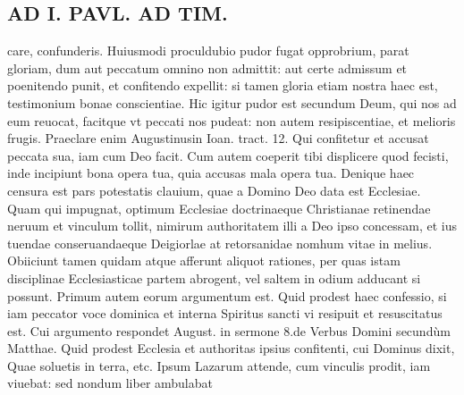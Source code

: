 \documentclass{article}
\begin{document}
\begin{pages}
\section*{AD I. PAVL. AD TIM. }
\marginpar{[ p.326 ]}\pstart care, confunderis. Huiusmodi proculdubio pudor fugat opprobrium, parat gloriam, dum aut peccatum omnino non admittit: aut certe admissum et poenitendo punit, et confitendo expellit: si tamen gloria etiam nostra haec est, testimonium bonae conscientiae. Hic igitur pudor est secundum Deum, qui nos ad eum reuocat, facitque vt peccati nos pudeat: non autem resipiscentiae, et melioris frugis. Praeclare enim Augustinusin Ioan. tract. 12. Qui confitetur et accusat peccata sua, iam cum Deo facit. Cum autem coeperit tibi displicere quod fecisti, inde incipiunt bona opera tua, quia accusas mala opera tua. Denique haec censura est pars potestatis clauium, quae a Domino Deo data est Ecclesiae. Quam qui impugnat, optimum Ecclesiae doctrinaeque Christianae retinendae neruum et vinculum tollit, nimirum authoritatem illi a Deo ipso concessam, et ius tuendae conseruandaeque Deigiorlae at retorsanidae nomhum vitae in melius.  \pend\pstart Obiiciunt tamen quidam atque afferunt aliquot rationes, per quas istam disciplinae Ecclesiasticae partem abrogent, vel saltem in odium adducant si possunt.  \pend\pstart Primum autem eorum argumentum est. Quid prodest haec confessio, si iam peccator voce dominica et interna Spiritus sancti vi resipuit et resuscitatus est. Cui argumento respondet August. in sermone 8.de Verbus  Domini secundùm Matthae. Quid prodest Ecclesia et authoritas ipsius confitenti, cui Dominus dixit, Quae soluetis in terra, etc. Ipsum Lazarum attende, cum vinculis prodit, iam viuebat: sed nondum liber ambulabat  \pend

\end{pages}
\end{document}
